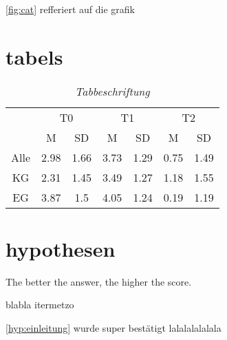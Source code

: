 \autoref{fig:cat} refferiert auf die grafik



\section{tabels}

\begin{table}[tb]
  \caption[das steht im tabverzeichnis]{\textit{Tabbeschriftung}}
  \begin{flushleft}
    \footnotesize
    \centering
    \begin{tabular}{ccccccc}
      \toprule
          & \multicolumn{2}{c}{T0} & \multicolumn{2}{c}{T1} & \multicolumn{2}{c}{T2}\\
      \cmidrule(lr){2-7} 
          & M    & SD   & M    & SD   & M    & SD   \\
      \hline
      Alle & 2.98 & 1.66 & 3.73 & 1.29 & 0.75 & 1.49 \\
      \hline
      KG   & 2.31 & 1.45 & 3.49 & 1.27 & 1.18 & 1.55 \\
      EG   & 3.87 & 1.5  & 4.05 & 1.24 & 0.19 & 1.19 \\
      \bottomrule
    \end{tabular}
  \end{flushleft}
  \label{table:Zeug}
\end{table}

\section{hypothesen}
\begin{hyp}
\label{hyp:einleitung}
The better the answer, the higher the score.
\end{hyp}


blabla itermetzo

\autoref{hyp:einleitung} wurde super bestätigt lalalalalalala


% 
% 
% 
% 
% 
% 
% 
% 




